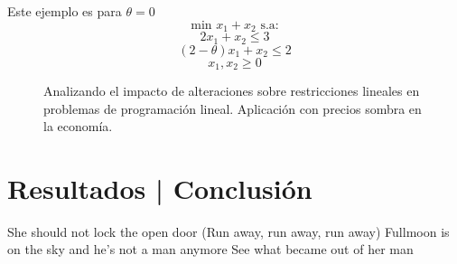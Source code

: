 \documentclass{sciposter}
\begin{document}
\begin{multicols}{3}
Este ejemplo es para $\theta = 0$
$$ \text{min } x_1 + x_2 \text{ s.a:} $$ 
$$2 x_1 + x_2 \leq 3$$ 
$$(2 -\theta )x_1 + x_2 \leq 2$$
$$ x_1, x_2 \geq 0 $$

\vfill

\begin{figure}
	\begin{center}
      \vspace*{15mm} 
	\end{center}
\caption{ \label{fig:binspect} Analizando el impacto de alteraciones sobre restricciones lineales en problemas de programaci\'on lineal. Aplicaci\'on con precios sombra en la econom\'ia.}
\end{figure}

\section{Resultados | Conclusi\'on}

She should not lock the open door
(Run away, run away, run away)
Fullmoon is on the sky and he's not a man anymore
See what became out of her man
 



\end{multicols}
\end{document}
